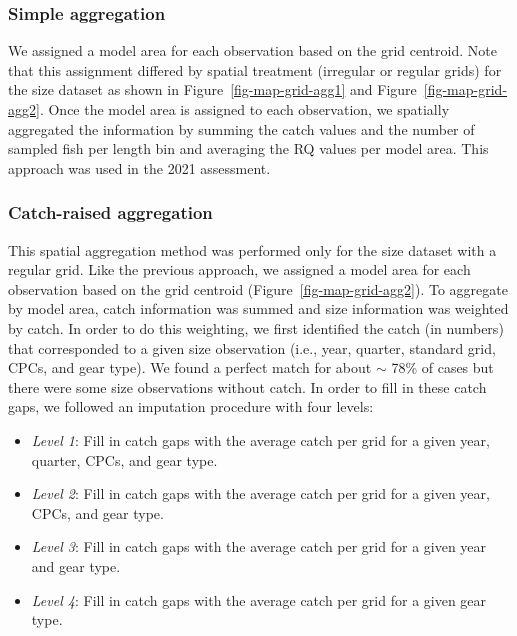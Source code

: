\documentclass[
]{scrartcl}
\providecommand{\tightlist}{%
  \setlength{\itemsep}{0pt}\setlength{\parskip}{0pt}}\usepackage{longtable,booktabs,array}
\begin{document}
\subsubsection{Simple aggregation}\label{simple-aggregation}

We assigned a model area for each observation based on the grid
centroid. Note that this assignment differed by spatial treatment
(irregular or regular grids) for the size dataset as shown in
Figure~\ref{fig-map-grid-agg1} and Figure~\ref{fig-map-grid-agg2}. Once
the model area is assigned to each observation, we spatially aggregated
the information by summing the catch values and the number of sampled
fish per length bin and averaging the RQ values per model area. This
approach was used in the 2021 assessment.

\subsubsection{Catch-raised aggregation}\label{catch-raised-aggregation}

This spatial aggregation method was performed only for the size dataset
with a regular grid. Like the previous approach, we assigned a model
area for each observation based on the grid centroid
(Figure~\ref{fig-map-grid-agg2}). To aggregate by model area, catch
information was summed and size information was weighted by catch. In
order to do this weighting, we first identified the catch (in numbers)
that corresponded to a given size observation (i.e., year, quarter,
standard grid, CPCs, and gear type). We found a perfect match for about
\(\sim\) 78\% of cases but there were some size observations without
catch. In order to fill in these catch gaps, we followed an imputation
procedure with four levels:

\begin{itemize}
\tightlist
\item
  \emph{Level 1}: Fill in catch gaps with the average catch per grid for
  a given year, quarter, CPCs, and gear type.
\item
  \emph{Level 2}: Fill in catch gaps with the average catch per grid for
  a given year, CPCs, and gear type.
\item
  \emph{Level 3}: Fill in catch gaps with the average catch per grid for
  a given year and gear type.
\item
  \emph{Level 4}: Fill in catch gaps with the average catch per grid for
  a given gear type.
\end{itemize}
\end{document}
